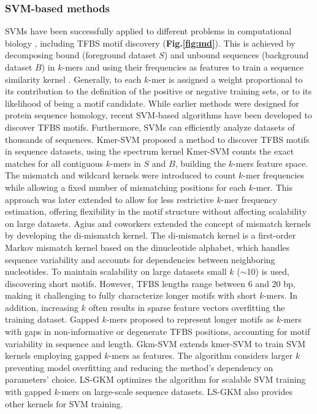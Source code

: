 \documentclass[a4paper, titlepage, openright]{book}
\begin{document}
\subsubsection{SVM-based methods}
SVMs \citep{boser1992training} have been successfully applied to different problems in computational biology  \citep{ben2008support}, including TFBS motif discovery (\textbf{Fig.\ref{fig:md}}).  This is achieved by decomposing bound (foreground dataset $S$) and unbound sequences (background dataset $B$) in $k$-mers and using their frequencies as features to train a sequence similarity kernel \citep{ben2008support}.  Generally, to each $k$-mer is assigned a weight proportional to its contribution to the definition of the positive or negative training sets, or to its likelihood of being a motif candidate. While earlier methods \citep{leslie2001spectrum,  eskin2002mismatch, kuang2005profile} were designed for protein sequence homology, recent SVM-based algorithms have been developed to discover TFBS motifs. Furthermore, SVMs can efficiently analyze datasets of thousands of sequences. Kmer-SVM \citep{lee2011discriminative, fletez2013kmer} proposed a method to discover TFBS motifs in sequence datasets, using the spectrum kernel \citep{leslie2001spectrum} Kmer-SVM counts the exact matches for all contiguous $k$-mers in $S$ and $B$, building the $k$-mers feature space. The mismatch and wildcard kernels \citep{kuang2005profile, leslie2003fast} were introduced to count $k$-mer frequencies while allowing a fixed number of mismatching positions for each $k$-mer. This approach was later extended to allow for less restrictive $k$-mer frequency estimation, offering flexibility in the motif structure without affecting scalability on large datasets. Agius and coworkers \citep{agius2010high} extended the concept of mismatch kernels by developing the di-mismatch kernel. The di-mismatch kernel is a first-order Markov mismatch kernel based on the dinucleotide alphabet, which handles sequence variability and accounts for dependencies between neighboring nucleotides. To maintain scalability on large datasets small $k$ ($\sim$10) is used, discovering short motifs. However, TFBS lengths range between 6 and 20 bp, making it challenging to fully characterize longer motifs with short $k$-mers. In addition, increasing  $k$ often results in sparse feature vectors overfitting the training dataset. Gapped $k$-mers \citep{ghandi2014robust} proposed to represent longer motifs as $k$-mers with gaps in non-informative or degenerate TFBS positions, accounting for motif variability in sequence and length. Gkm-SVM \citep{ghandi2014enhanced, ghandi2016gkmsvm} extends kmer-SVM to train SVM kernels employing gapped $k$-mers as features. The algorithm considers larger $k$ preventing model overfitting and reducing the method’s dependency on parameters’ choice. LS-GKM \citep{lee2016ls} optimizes the algorithm for scalable SVM training with gapped $k$-mers on large-scale sequence datasets. LS-GKM also provides other kernels for SVM training.
\end{document}
